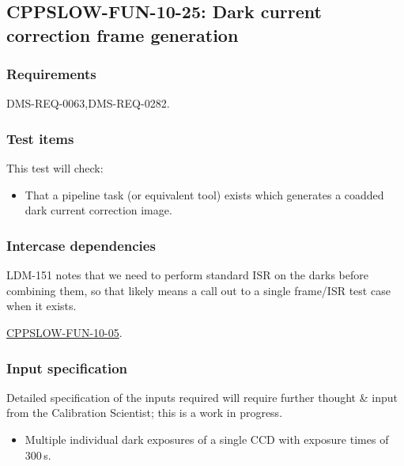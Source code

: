 \subsection{CPPSLOW-FUN-10-25: Dark current correction frame generation}
\label{cppslow-fun-10-25}

\subsubsection{Requirements}

DMS-REQ-0063,DMS-REQ-0282.

\subsubsection{Test items}

This test will check:

\begin{itemize}

  \item{That a pipeline task (or equivalent tool) exists which generates a
  coadded dark current correction image.}

\end{itemize}

\subsubsection{Intercase dependencies}

\begin{note}
LDM-151 notes that we need to perform standard ISR on the darks
before combining them, so that likely means a call out to a single frame/ISR
test case when it exists.
\end{note}

\hyperref[cppslow-fun-10-05]{CPPSLOW-FUN-10-05}.

\subsubsection{Input specification}

\begin{note}
Detailed specification of the inputs required will require further thought \&
input from the Calibration Scientist; this is a work in progress.
\end{note}

\begin{itemize}

  \item{Multiple individual dark exposures of a single CCD with exposure times
  of 300\,s.}

\end{itemize}

